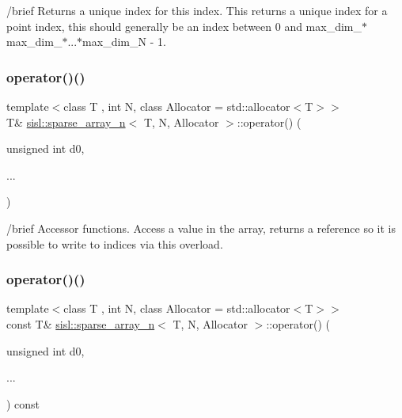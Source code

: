 /brief Returns a unique index for this index. This returns a unique index for a point index, this should generally be an index between 0 and max\+\_\+dim\+\_$\ast$max\+\_\+dim\+\_$\ast$...$\ast$max\+\_\+dim\+\_\+N -\/ 1. \mbox{\label{classsisl_1_1sparse__array__n_a828d9cd11de929845c584d469b4cfb0d}} 
\subsubsection{\texorpdfstring{operator()()}{operator()()}\hspace{0.1cm}{\footnotesize\ttfamily [1/4]}}
{\footnotesize\ttfamily template$<$class T , int N, class Allocator  = std\+::allocator$<$\+T$>$$>$ \\
T\& \hyperlink{classsisl_1_1sparse__array__n}{sisl\+::sparse\+\_\+array\+\_\+n}$<$ T, N, Allocator $>$\+::operator() (\begin{DoxyParamCaption}\item[{unsigned int}]{d0,  }\item[{}]{... }\end{DoxyParamCaption})\hspace{0.3cm}{\ttfamily [inline]}}

/brief Accessor functions. Access a value in the array, returns a reference so it is possible to write to indices via this overload. \mbox{\label{classsisl_1_1sparse__array__n_a37b840c55a4225232fdc8852a1a068dd}} 
\subsubsection{\texorpdfstring{operator()()}{operator()()}\hspace{0.1cm}{\footnotesize\ttfamily [2/4]}}
{\footnotesize\ttfamily template$<$class T , int N, class Allocator  = std\+::allocator$<$\+T$>$$>$ \\
const T\& \hyperlink{classsisl_1_1sparse__array__n}{sisl\+::sparse\+\_\+array\+\_\+n}$<$ T, N, Allocator $>$\+::operator() (\begin{DoxyParamCaption}\item[{unsigned int}]{d0,  }\item[{}]{... }\end{DoxyParamCaption}) const\hspace{0.3cm}{\ttfamily [inline]}}

